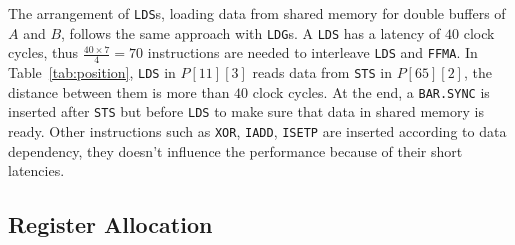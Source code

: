 The arrangement of {\tt LDS}s, loading data from shared memory for double buffers of $A$ and $B$, follows the same approach with {\tt LDG}s.
A {\tt LDS} has a latency of $40$ clock cycles, thus $\frac{40\times 7}{4}=70$ instructions are needed to interleave {\tt LDS} and {\tt FFMA}.
In Table~\ref{tab:position}, {\tt LDS} in $P[11][3]$ reads data from {\tt STS} in $P[65][2]$,
the distance between them is more than $40$ clock cycles.
At the end, a {\tt BAR.SYNC} is inserted after {\tt STS} but before {\tt LDS} to make sure that data in shared memory is ready.
Other instructions such as {\tt XOR}, {\tt IADD}, {\tt ISETP} are inserted according to data dependency, they doesn't influence the performance because of their short latencies.


\subsection{Register Allocation}

